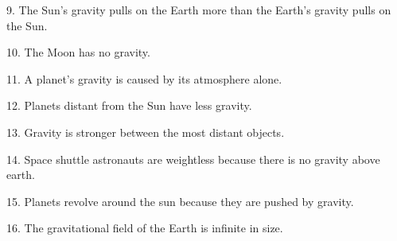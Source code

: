 \documentclass[10pt]{examdesign}
\begin{document}
\begin{truefalse} [title={True or False},
	rearrange=no]
	\begin{question}
		 9. The Sun's gravity pulls on the Earth more than the Earth's gravity pulls on the Sun.  
	\end{question}
	\begin{question}
		 10. The Moon has no gravity.
	\end{question}

	\begin{question}
	 11. A planet's gravity is caused by its atmosphere alone.
\end{question}

	\begin{question}
	 12. Planets distant from the Sun have less gravity.
\end{question}

	\begin{question}
	 13. Gravity is stronger between the most distant objects.
\end{question}

	\begin{question}
	 14. Space shuttle astronauts are weightless because there is no gravity above earth.
\end{question}


\begin{question}
	 15. Planets revolve around the sun because they are pushed by gravity.
\end{question}



\begin{question}
		 16. The gravitational field of the Earth is infinite in size. 
	\end{question}
		


\end{truefalse}
\end{document}
